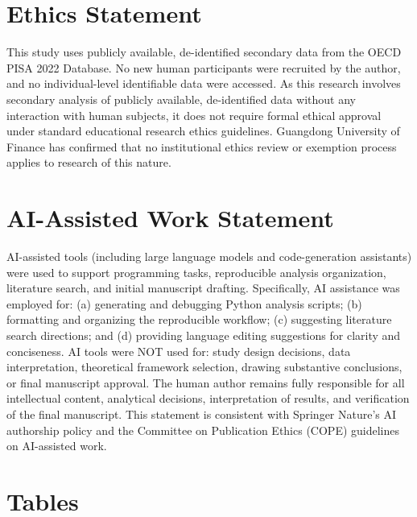 \documentclass[pdflatex,sn-mathphys-ay]{sn-jnl}
\begin{document}
\section{Ethics Statement}

This study uses publicly available, de-identified secondary data from the OECD PISA 2022 Database. No new human participants were recruited by the author, and no individual-level identifiable data were accessed. As this research involves secondary analysis of publicly available, de-identified data without any interaction with human subjects, it does not require formal ethical approval under standard educational research ethics guidelines. Guangdong University of Finance has confirmed that no institutional ethics review or exemption process applies to research of this nature.

\section{AI-Assisted Work Statement}

AI-assisted tools (including large language models and code-generation assistants) were used to support programming tasks, reproducible analysis organization, literature search, and initial manuscript drafting. Specifically, AI assistance was employed for: (a) generating and debugging Python analysis scripts; (b) formatting and organizing the reproducible workflow; (c) suggesting literature search directions; and (d) providing language editing suggestions for clarity and conciseness. AI tools were NOT used for: study design decisions, data interpretation, theoretical framework selection, drawing substantive conclusions, or final manuscript approval. The human author remains fully responsible for all intellectual content, analytical decisions, interpretation of results, and verification of the final manuscript. This statement is consistent with Springer Nature's AI authorship policy and the Committee on Publication Ethics (COPE) guidelines on AI-assisted work.

\section*{Tables}



\clearpage




\end{document}
